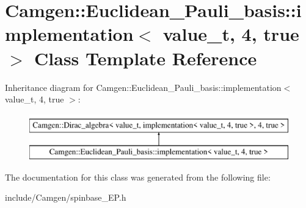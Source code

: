 \hypertarget{a00298}{\section{Camgen\-:\-:Euclidean\-\_\-\-Pauli\-\_\-basis\-:\-:implementation$<$ value\-\_\-t, 4, true $>$ Class Template Reference}
\label{a00298}
}
Inheritance diagram for Camgen\-:\-:Euclidean\-\_\-\-Pauli\-\_\-basis\-:\-:implementation$<$ value\-\_\-t, 4, true $>$\-:\begin{figure}[H]
\begin{center}
\leavevmode
\includegraphics[height=2.000000cm]{a00298}
\end{center}
\end{figure}


The documentation for this class was generated from the following file\-:\begin{DoxyCompactItemize}
\item 
include/\-Camgen/spinbase\-\_\-\-E\-P.\-h\end{DoxyCompactItemize}
